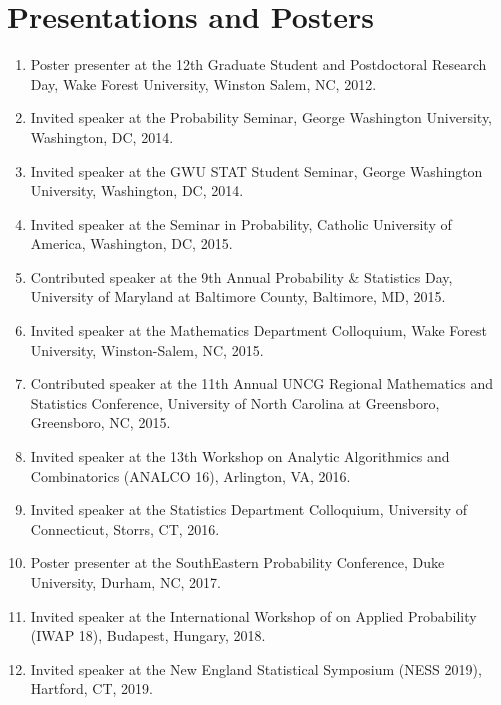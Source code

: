 \documentclass[12pt]{article}
\begin{document}
	\section*{Presentations and Posters}
	\begin{enumerate}
		\item Poster presenter at the 12th Graduate Student and Postdoctoral Research Day, Wake Forest University, Winston Salem, NC, 2012.
		
		\item Invited speaker at the Probability Seminar, George Washington University, Washington, DC, 2014.
		
		\item Invited speaker at the GWU STAT Student Seminar, George Washington University, Washington, DC, 2014.
		
		\item Invited speaker at the Seminar in Probability, Catholic University of America, Washington, DC, 2015.
		
		\item Contributed speaker at the 9th Annual Probability \& Statistics Day, University of Maryland at Baltimore County, Baltimore, MD, 2015.
		
		\item Invited speaker at the Mathematics Department Colloquium, Wake Forest University, Winston-Salem, NC, 2015. 
		
		\item Contributed speaker at the 11th Annual UNCG Regional Mathematics and Statistics Conference, University of North Carolina at Greensboro, Greensboro, NC, 2015.
		
		\item Invited speaker at the 13th Workshop on Analytic Algorithmics and Combinatorics (ANALCO 16), Arlington, VA, 2016.
		
		\item Invited speaker at the Statistics Department Colloquium, University of Connecticut, Storrs, CT, 2016.
		
		\item Poster presenter at the SouthEastern Probability Conference, Duke University, Durham, NC, 2017.
		
		\item Invited speaker at the International Workshop of on Applied Probability (IWAP 18), Budapest, Hungary, 2018.
		
		\item Invited speaker at the New England Statistical Symposium (NESS 2019), Hartford, CT, 2019.
		

\end{enumerate}
\end{document}
